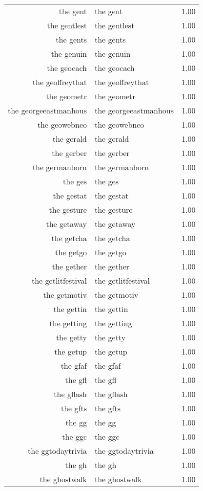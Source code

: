 \begin{table}[ht]
\begin{tabular}{rlr}
  the gent & the gent & 1.00 \\ 
  the gentlest & the gentlest & 1.00 \\ 
  the gents & the gents & 1.00 \\ 
  the genuin & the genuin & 1.00 \\ 
  the geocach & the geocach & 1.00 \\ 
  the geoffreythat & the geoffreythat & 1.00 \\ 
  the geometr & the geometr & 1.00 \\ 
  the georgeeastmanhous & the georgeeastmanhous & 1.00 \\ 
  the geowebneo & the geowebneo & 1.00 \\ 
  the gerald & the gerald & 1.00 \\ 
  the gerber & the gerber & 1.00 \\ 
  the germanborn & the germanborn & 1.00 \\ 
  the ges & the ges & 1.00 \\ 
  the gestat & the gestat & 1.00 \\ 
  the gesture & the gesture & 1.00 \\ 
  the getaway & the getaway & 1.00 \\ 
  the getcha & the getcha & 1.00 \\ 
  the getgo & the getgo & 1.00 \\ 
  the gether & the gether & 1.00 \\ 
  the getlitfestival & the getlitfestival & 1.00 \\ 
  the getmotiv & the getmotiv & 1.00 \\ 
  the gettin & the gettin & 1.00 \\ 
  the getting & the getting & 1.00 \\ 
  the getty & the getty & 1.00 \\ 
  the getup & the getup & 1.00 \\ 
  the gfaf & the gfaf & 1.00 \\ 
  the gfl & the gfl & 1.00 \\ 
  the gflash & the gflash & 1.00 \\ 
  the gfts & the gfts & 1.00 \\ 
  the gg & the gg & 1.00 \\ 
  the ggc & the ggc & 1.00 \\ 
  the ggtodaytrivia & the ggtodaytrivia & 1.00 \\ 
  the gh & the gh & 1.00 \\ 
  the ghostwalk & the ghostwalk & 1.00 \\ 

\end{tabular}
\end{table}
